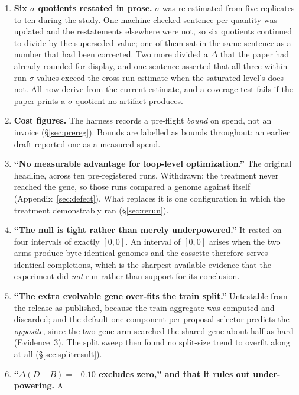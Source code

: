 \documentclass[11pt]{article}
\newcommand{\dd}{\ensuremath{\Delta}}
\begin{document}
\begin{enumerate}
    $+0.019$ (\S\ref{sec:repeat}): still not significant, but its reported \emph{sign} was a
    sampling artifact.
  \item \textbf{Six $\sigma$ quotients restated in prose.} $\sigma$ was re-estimated from five
    replicates to ten during the study. One machine-checked sentence per quantity was updated and
    the restatements elsewhere were not, so six quotients continued to divide by the superseded
    value; one of them sat in the same sentence as a number that had been corrected. Two more
    divided a $\dd$ that the paper had already rounded for display, and one sentence asserted
    that all three within-run $\sigma$ values exceed the cross-run estimate when the saturated
    level's does not. All now derive from the current estimate, and a coverage test fails if the
    paper prints a $\sigma$ quotient no artifact produces.
  \item \textbf{Cost figures.} The harness records a pre-flight \emph{bound} on spend, not an
    invoice (\S\ref{sec:prereg}). Bounds are labelled as bounds throughout; an earlier draft
    reported one as a measured spend.
  \item \textbf{``No measurable advantage for loop-level optimization.''} The original headline,
    across ten pre-registered runs. Withdrawn: the treatment never reached the gene, so those
    runs compared a genome against itself (Appendix~\ref{sec:defect}). What replaces it is one
    configuration in which the treatment demonstrably ran (\S\ref{sec:rerun}).
  \item \textbf{``The null is tight rather than merely underpowered.''} It rested on four
    intervals of exactly $[0,0]$. An interval of $[0,0]$ arises when the two arms produce
    byte-identical genomes and the cassette therefore serves identical completions, which is the
    sharpest available evidence that the experiment did \emph{not} run rather than support for
    its conclusion.
  \item \textbf{``The extra evolvable gene over-fits the train split.''} Untestable from the
    release as published, because the train aggregate was computed and discarded; and the
    default one-component-per-proposal selector predicts the \emph{opposite}, since the two-gene
    arm searched the shared gene about half as hard (Evidence~3). The split sweep then found no
    split-size trend to overfit along at all (\S\ref{sec:splitresult}).
  \item \textbf{``$\dd(D-B) = -0.10$ excludes zero,'' and that it rules out under-powering.} A

\end{enumerate}
\end{document}
